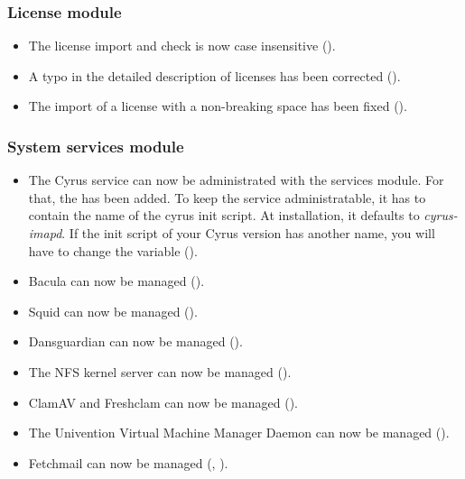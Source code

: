 

\subsubsection{License module}
\begin{itemize}
\item The license import and check is now case insensitive
  ().
\item A typo in the detailed description of licenses has been
  corrected ().
\item The import of a license with a non-breaking space has been fixed
  ().
\end{itemize}



\subsubsection{System services module}
\begin{itemize}
\item The Cyrus service can now be administrated with the services
  module. For that, the  has been
  added. To keep the service administratable, it has to contain the 
  name of the cyrus init script. At installation, it defaults to
  \emph{cyrus-imapd}. If the init script of your Cyrus version has
  another name, you will have to change the variable ().
\item Bacula can now be managed ().
\item Squid can now be managed ().
\item Dansguardian can now be managed ().
\item The NFS kernel server can now be managed ().
\item ClamAV and Freshclam can now be managed ().
\item The Univention Virtual Machine Manager Daemon can now be managed ().
\item Fetchmail can now be managed (, ).
\end{itemize}

